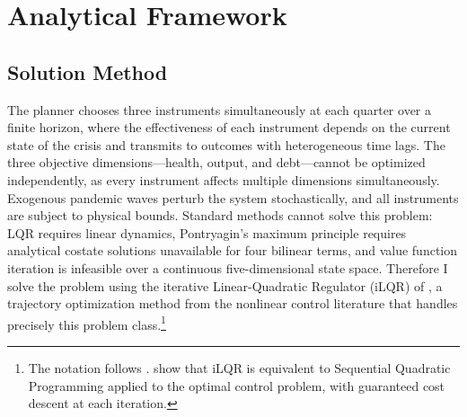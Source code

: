 \documentclass[12pt, a4paper]{article}
\begin{document}
\section{Analytical Framework}
\label{app:analytical}


\subsection{Solution Method}
\label{sec:solution}

The planner chooses three instruments simultaneously at each quarter over a finite
horizon, where the effectiveness of each instrument depends on the current state of
the crisis and transmits to outcomes with heterogeneous time lags. The three
objective dimensions---health, output, and debt---cannot be optimized independently,
as every instrument affects multiple dimensions simultaneously. Exogenous pandemic
waves perturb the system stochastically, and all instruments are subject to physical
bounds. Standard methods cannot solve this problem: LQR requires linear dynamics,
Pontryagin's maximum principle requires analytical costate solutions unavailable for
four bilinear terms, and value function iteration is infeasible over a continuous
five-dimensional state space. Therefore I solve the problem using the iterative Linear-Quadratic Regulator (iLQR) of \citet{li2004iterative}, a trajectory optimization method from the nonlinear control literature that handles precisely this problem class.\footnote{The notation follows
\citet[Chapters~3--4]{bertsekas2017dynamic}. \citet{sharma2025sqp} show that iLQR
is equivalent to Sequential Quadratic Programming applied to the optimal control
problem, with guaranteed cost descent at each iteration.} 
\end{document}
